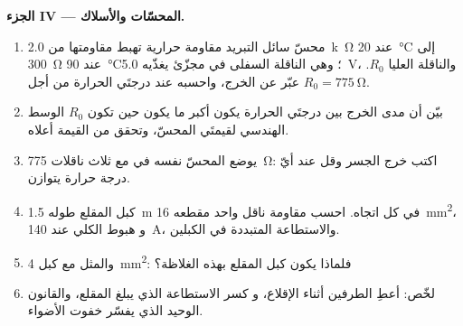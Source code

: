 \begin{problem}
\medskip
\noindent\textbf{الجزء IV --- المحسّات والأسلاك.}
\begin{enumerate}[resume]
  \item محسّ سائل التبريد مقاومة حرارية تهبط مقاومتها من
        \qty{2.0}{k\ohm} عند \qty{20}{\degreeCelsius} إلى \qty{300}{\ohm} عند
        \qty{90}{\degreeCelsius}؛ وهي الناقلة السفلى في مجزّئ
        يغذّيه \qty{5.0}{V}، والناقلة العليا $R_0$. عبّر عن
         الخرج، واحسبه عند درجتَي الحرارة من أجل
        $R_0 = \qty{775}{\ohm}$.
  \item بيّن أن مدى الخرج بين درجتَي الحرارة يكون
        أكبر ما يكون حين تكون $R_0$ الوسط الهندسي لقيمتَي
        المحسّ، وتحقق من القيمة أعلاه.
  \item يوضع المحسّ نفسه في  مع ثلاث
        ناقلات \qty{775}{\ohm}: اكتب خرج الجسر وقل عند
        أيّ درجة حرارة يتوازن.
  \item كبل المقلع طوله \qty{1.5}{m} في كل اتجاه. احسب
        مقاومة ناقل واحد مقطعه \qty{16}{mm^2}، و
        هبوط  الكلي عند \qty{140}{A}، والاستطاعة المتبددة في
        الكبلين.
  \item والمثل مع كبل \qty{4}{mm^2}: فلماذا يكون كبل المقلع بهذه الغلاظة؟
  \item لخّص: أعطِ  الطرفين أثناء الإقلاع، و
        كسر الاستطاعة الذي يبلغ المقلع، والقانون الوحيد الذي
        يفسّر خفوت الأضواء.
\end{enumerate}
\end{problem}
